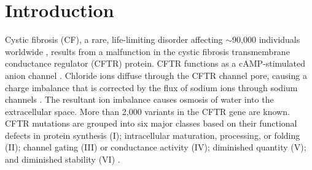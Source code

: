 \smallskip

\section{Introduction}
Cystic fibrosis (CF), a rare, life-limiting disorder affecting $\sim$90,000 individuals worldwide \cite{rasaruseckaite2017}, results from a malfunction in the cystic fibrosis transmembrane conductance regulator (CFTR) protein. CFTR functions as a cAMP-stimulated anion channel \cite{saint-criq2017}. Chloride ions diffuse through the CFTR channel pore, causing a charge imbalance that is corrected by the flux of sodium ions through sodium channels \cite{saint-criq2017}. The resultant ion imbalance causes osmosis of water into the extracellular space. More than 2,000 variants in the CFTR gene are known. CFTR mutations are grouped into six major classes based on their functional defects in protein synthesis (I); intracellular maturation, processing, or folding (II); channel gating (III) or conductance activity (IV); diminished quantity (V); and diminished stability (VI) \cite{marson2016}.

